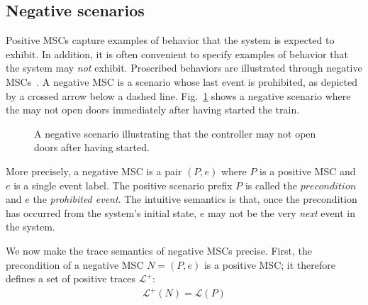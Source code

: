 \subsection{Negative scenarios\label{subsection:background-negative-scenarios}}

Positive MSCs capture examples of behavior that the system is expected to exhibit. In addition, it is often convenient to specify examples of behavior that the system may \emph{not} exhibit. Proscribed behaviors are illustrated through negative MSCs~\cite{Uchitel:2002, Uchitel:2004}. A negative MSC is a scenario whose last event is prohibited, as depicted by a crossed arrow below a dashed line. Fig.~\ref{image:train-negative-scenario} shows a negative scenario where the  may not open doors immediately after having started the train.

\begin{figure}
\centering
{}
\caption[A negative scenario]{A negative scenario illustrating that the controller may not open doors after having started.\label{image:train-negative-scenario}}
\end{figure}

More precisely, a negative MSC is a pair $(P,e)$ where $P$ is a positive MSC and $e$ is a single event label. The positive scenario prefix $P$ is called the $precondition$ and $e$ the \emph{prohibited event}. The intuitive semantics is that, once the precondition has occurred from the system's initial state, $e$ may not be the very \emph{next} event in the system. 

We now make the trace semantics of negative MSCs precise. First, the precondition of a negative MSC $N = (P,e)$ is a positive MSC; it therefore defines a set of positive traces $\mathcal{L}^{+}$:
\begin{align}
\mathcal{L}^{+}(N) = \mathcal{L}(P)
\end{align}

